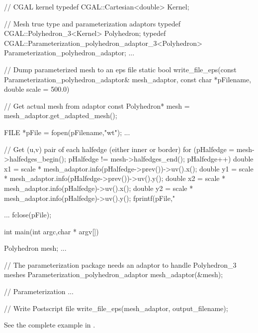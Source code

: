 \begin{ccExampleCode}

// CGAL kernel
typedef CGAL::Cartesian<double>                         Kernel;

// Mesh true type and parameterization adaptors
typedef CGAL::Polyhedron_3<Kernel>                      Polyhedron;
typedef CGAL::Parameterization_polyhedron_adaptor_3<Polyhedron>     
                                                        Parameterization_polyhedron_adaptor;
...

// Dump parameterized mesh to an eps file
static bool write_file_eps(const Parameterization_polyhedron_adaptor& mesh_adaptor,
                           const char *pFilename,
                           double scale = 500.0)
{
    // Get actual mesh from adaptor
    const Polyhedron* mesh = mesh_adaptor.get_adapted_mesh();

    FILE *pFile = fopen(pFilename,"wt");
    ...

    // Get (u,v) pair of each halfedge (either inner or border)
    for (pHalfedge = mesh->halfedges_begin();
         pHalfedge != mesh->halfedges_end();
         pHalfedge++)
    {
        double x1 = scale * mesh_adaptor.info(pHalfedge->prev())->uv().x();
        double y1 = scale * mesh_adaptor.info(pHalfedge->prev())->uv().y();
        double x2 = scale * mesh_adaptor.info(pHalfedge)->uv().x();
        double y2 = scale * mesh_adaptor.info(pHalfedge)->uv().y();
        fprintf(pFile,"%
    }

    ...
    fclose(pFile);
}

int main(int argc,char * argv[])
{
    Polyhedron mesh;
    ...

    // The parameterization package needs an adaptor to handle Polyhedron_3 meshes
    Parameterization_polyhedron_adaptor mesh_adaptor(&mesh);

    // Parameterization
    ...

    // Write Postscript file
    write_file_eps(mesh_adaptor, output_filename);
}

\end{ccExampleCode}

See the complete example in .
